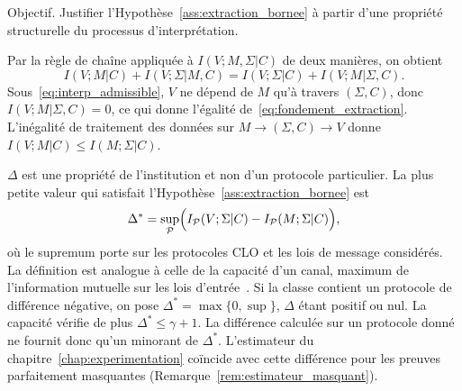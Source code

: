 \begin{sloppypar}
\begin{Preuve}\label{prv:fondement_extraction}
\begin{cmtEtape}{Objectif.}
Justifier l'Hypoth\`ese~\ref{ass:extraction_bornee} \`a partir d'une
propri\'et\'e structurelle du processus d'interpr\'etation.
\end{cmtEtape}
Par la r\`egle de cha\^ine appliqu\'ee \`a $I(V;M,\Sigma|C)$ de deux
mani\`eres, on obtient
\begin{equation}
I(V;M|C) + I(V;\Sigma|M,C) = I(V;\Sigma|C) + I(V;M|\Sigma,C).
\end{equation}
Sous~\eqref{eq:interp_admissible}, $V$ ne d\'epend de $M$ qu'\`a travers
$(\Sigma,C)$, donc $I(V;M|\Sigma,C)=0$, ce qui donne l'\'egalit\'e
de~\eqref{eq:fondement_extraction}. L'in\'egalit\'e de traitement des
donn\'ees sur $M \to (\Sigma,C) \to V$ donne
$I(V;M|C) \leq I(M;\Sigma|C)$.
\end{Preuve}

\begin{remark}
\label{rem:delta_capacite}
$\Delta$ est une propri\'et\'e de l'institution et non d'un protocole particulier. La
plus petite valeur qui satisfait l'Hypoth\`ese~\ref{ass:extraction_bornee} est
\begin{equation}
\Delta^* = \sup_{\mathcal{P}} \Bigl(I_{\mathcal{P}}(V;\Sigma|C) - I_{\mathcal{P}}(M;\Sigma|C)\Bigr),
\label{eq:delta_capacite}
\end{equation}
o\`u le supremum porte sur les protocoles CLO et les lois de message consid\'er\'es.
La d\'efinition est analogue \`a celle de la capacit\'e d'un canal, maximum de l'information
mutuelle sur les lois d'entr\'ee~\cite{CoverThomas06}. Si la classe contient un protocole
de diff\'erence n\'egative, on pose $\Delta^* = \max\{0, \sup\}$, $\Delta$ \'etant positif ou nul. La
capacit\'e v\'erifie de plus $\Delta^* \leq \gamma + 1$. La diff\'erence calcul\'ee sur un
protocole donn\'e ne fournit donc qu'un minorant de $\Delta^*$. L'estimateur du
chapitre~\ref{chap:experimentation} co\"incide avec cette diff\'erence pour les preuves
parfaitement masquantes (Remarque~\ref{rem:estimateur_masquant}).
\end{remark}


\end{sloppypar}
